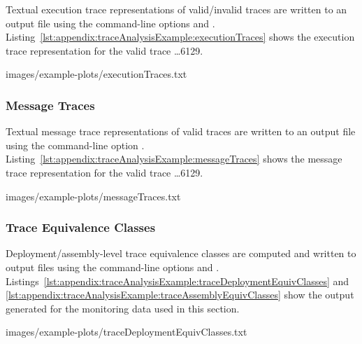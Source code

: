 Textual execution trace representations of valid/invalid traces are written to %
an output file using the command-line options \OPT{\OPTprintValidExecutionTraces} and %
\OPT{\OPTprintInvalidExecutionTraces}. %
Listing~\ref{lst:appendix:traceAnalysisExample:executionTraces} %
shows the execution trace representation for the valid trace \ldots6129.

\setTextListing
%
{images/example-plots/executionTraces.txt}

\subsubsection{Message Traces}\label{sec:example:messageTraces}%

Textual message trace representations of valid traces are written to an output %
file using the command-line option \OPT{\OPTprintMessageTraces}. %
Listing~\ref{lst:appendix:traceAnalysisExample:messageTraces} %
shows the message trace representation for the valid trace \ldots6129.

\setTextListing
%
{images/example-plots/messageTraces.txt}

\subsubsection{Trace Equivalence Classes}\label{sec:example:traceEquivClasses}%

Deployment/assembly-level trace equivalence classes are computed and written %
to output files using the command-line options \OPT{\OPTprintDeploymentEquivalenceClasses} %
and \OPT{\OPTprintAssemblyEquivalenceClasses}. %
Listings~\ref{lst:appendix:traceAnalysisExample:traceDeploymentEquivClasses} and %
\ref{lst:appendix:traceAnalysisExample:traceAssemblyEquivClasses} show the %
output generated for the monitoring data used in this section. %

\setTextListing

{images/example-plots/traceDeploymentEquivClasses.txt}

